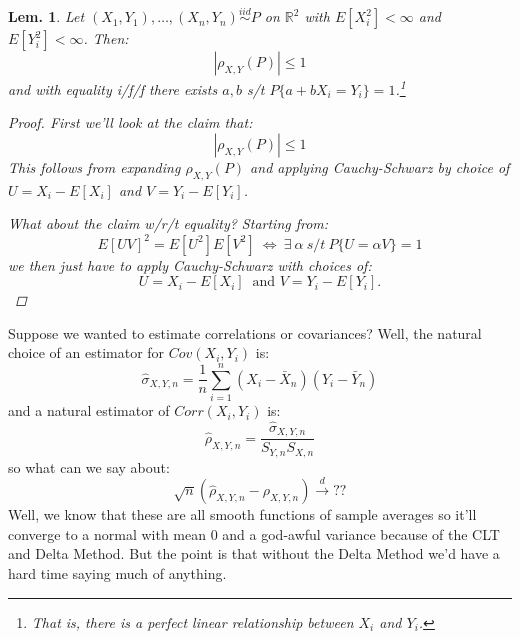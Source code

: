 \documentclass{tufte-book}
\theoremstyle{mytheoremstyle}
\theoremstyle{mylemstyle}
\newtheorem*{lem}{Lem.}
\theoremstyle{mydefstyle}
\begin{document}
\begin{lem} Let \((X_1, Y_1), \dots, (X_n, Y_n) \overset{iid}{\sim} P\) on \(\mathbb{R}^2\) with \(E[X_i^2] < \infty\) and \(E[Y_i^2] < \infty\). Then:
	\[|\rho_{X, Y}(P)| \le 1\]
and with equality i/f/f there exists \(a, b\) s/t \(P\{a + bX_i = Y_i\} = 1\).\footnote{That is, there is a perfect linear relationship between \(X_i\) and \(Y_i\).}

	\begin{proof}
	First we'll look at the claim that:
		\[|\rho_{X, Y}(P)| \le 1\]
	This follows from expanding \(\rho_{X, Y}(P)\) and applying Cauchy-Schwarz by choice of \(U = X_i - E[X_i]\) and \(V = Y_i - E[Y_i]\). 
	
	What about the claim w/r/t equality? Starting from:
		\[E[UV]^2 = E[U^2]E[V^2]\ \iff\ \exists\ \alpha\ s/t\ P\{U = \alpha V\} = 1\]
	we then just have to apply Cauchy-Schwarz with choices of:
		\[U = X_i - E[X_i]\ \text{ and } V = Y_i - E[Y_i] \text{.}\]
	\end{proof}

\end{lem}
Suppose we wanted to estimate correlations or covariances? Well, the natural choice of an estimator for \(Cov(X_i, Y_i)\) is:
	\[\hat{\sigma}_{X, Y, n} = \frac{1}{n} \sum_{i = 1}^n (X_i - \bar{X}_n)(Y_i - \bar{Y}_n)\]
and a natural estimator of \(Corr(X_i, Y_i)\) is:
	\[\hat{\rho}_{X, Y, n} = \frac{\hat{\sigma}_{X, Y, n}}{S_{Y, n}S_{X, n}}\]
so what can we say about:
	\[\sqrt{n}(\hat{\rho}_{X, Y, n} - \rho_{X, Y, n }) \overset{d}{\rightarrow} ??\]
Well, we know that these are all smooth functions of sample averages so it'll converge to a normal with mean 0 and a god-awful variance because of the CLT and Delta Method. But the point is that without the Delta Method we'd have a hard time saying much of anything. 
\end{document}
